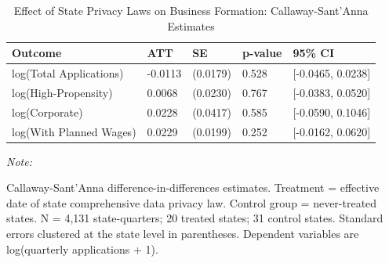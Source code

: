 \begin{table}[!h]
\centering
\caption{\label{tab:tab:main}Effect of State Privacy Laws on Business Formation: Callaway-Sant'Anna Estimates}
\centering
\begin{threeparttable}
\begin{tabular}[t]{lllll}
\toprule
Outcome & ATT & SE & p-value & 95\% CI\\
\midrule
log(Total Applications) & -0.0113 & (0.0179) & 0.528 & {}[-0.0465, 0.0238]\\
log(High-Propensity) & 0.0068 & (0.0230) & 0.767 & {}[-0.0383, 0.0520]\\
log(Corporate) & 0.0228 & (0.0417) & 0.585 & {}[-0.0590, 0.1046]\\
log(With Planned Wages) & 0.0229 & (0.0199) & 0.252 & {}[-0.0162, 0.0620]\\
\bottomrule
\end{tabular}
\begin{tablenotes}
\item \textit{Note: } 
\item Callaway-Sant'Anna difference-in-differences estimates. Treatment = effective date of state comprehensive data privacy law. Control group = never-treated states. N = 4,131 state-quarters; 20 treated states; 31 control states. Standard errors clustered at the state level in parentheses. Dependent variables are log(quarterly applications + 1).
\end{tablenotes}
\end{threeparttable}
\end{table}
